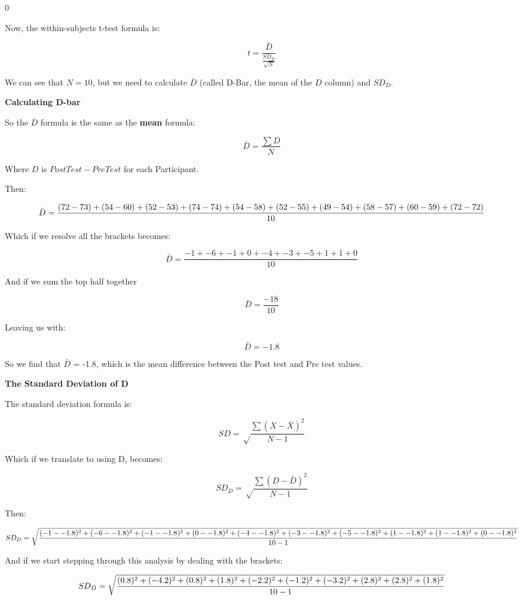 \documentclass[
  oneside]{book}
\begin{document}
0

Now, the within-subjects t-test formula is:

\[t = \frac{\bar{D}}{\frac{SD_{D}}{\sqrt{N}}}\]

We can see that \(N = 10\), but we need to calculate \(\bar{D}\) (called D-Bar, the mean of the \(D\) column) and \(SD_{D}\).

\textbf{Calculating D-bar}

So the \(\bar{D}\) formula is the same as the \textbf{mean} formula:

\[\bar{D} = \frac{\sum{D}}{N}\]

Where \(D\) is \(PostTest - PreTest\) for each Participant.

Then:

\[\bar{D} = \frac{(72 - 73) + (54 - 60) + (52 - 53) + (74 - 74) + (54 - 58) + \\ (52- 55) + (49 - 54) + (58 - 57) + (60 - 59) + (72 - 72)}{10}\]

Which if we resolve all the brackets becomes:

\[\bar{D} = \frac{-1 + -6 + -1 + 0 + -4 + -3 + -5 + 1 + 1 + 0}{10}\]

And if we sum the top half together

\[\bar{D} = \frac{-18}{10}\]

Leaving us with:

\[\bar{D} = -1.8\]

So we find that \(\bar{D}\) = -1.8, which is the mean difference between the Post test and Pre test values.

\textbf{The Standard Deviation of D}

The standard deviation formula is:

\[SD = \sqrt\frac{\sum(X - \bar{X})^2}{N-1}\]

Which if we translate to using D, becomes:

\[SD_{D} = \sqrt\frac{\sum(D - \bar{D})^2}{N-1}\]

Then:

\[SD_{D} =\sqrt\frac{(-1 - -1.8)^2 + (-6 - -1.8)^2 + (-1 - -1.8)^2 + (0 - -1.8)^2 + (-4 - -1.8)^2 + \\ (-3 - -1.8)^2 + (-5 - -1.8)^2 + (1 - -1.8)^2 + (1 - -1.8)^2 + (0 - -1.8)^2}{10 - 1}\]

And if we start stepping through this analysis by dealing with the brackets:

\[SD_{D} =\sqrt\frac{(0.8)^2 + (-4.2)^2 + (0.8)^2 + (1.8)^2 + (-2.2)^2 + \\ (-1.2)^2 + (-3.2)^2 + (2.8)^2 + (2.8)^2 + (1.8)^2}{10 - 1}\]
\end{document}
